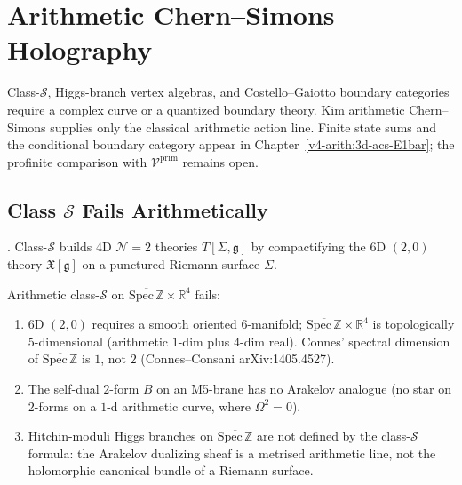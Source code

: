 \chapter{Arithmetic Chern--Simons Holography}
\label{v4-arith:gaiotto}

Class-\(\mathcal S\), Higgs-branch vertex algebras, and
Costello--Gaiotto boundary categories require a complex curve or a
quantized boundary theory. Kim arithmetic Chern--Simons supplies only
the classical arithmetic action line. Finite state sums and the
conditional boundary category appear in
Chapter~\ref{v4-arith:3d-acs-E1bar}; the profinite comparison with
\(\mathcal V^{\mathrm{prim}}\) remains open.

\section{Class \(\mathcal{S}\) Fails Arithmetically}
\label{v4-arith:ga:class-S-fails}

\begin{theorem}
\label{v4-arith:thm:gaiotto-class-S}
\ClaimStatusProvedElsewhere. Class-\(\mathcal{S}\) builds
4D \(\mathcal{N}=2\) theories \(T[\Sigma,\mathfrak{g}]\) by
compactifying the 6D \((2,0)\) theory \(\mathfrak{X}[\mathfrak{g}]\) on
a punctured Riemann surface \(\Sigma\).
\end{theorem}

\begin{observation}
\label{v4-arith:obs:class-S-obstructions}
Arithmetic class-\(\mathcal{S}\) on \(\overline{\mathrm{Spec}\,\mathbb{Z}}\times\mathbb{R}^{4}\)
fails:
\begin{enumerate}
\item 6D \((2,0)\) requires a smooth oriented \(6\)-manifold;
\(\overline{\mathrm{Spec}\,\mathbb{Z}}\times\mathbb{R}^{4}\) is
topologically \(5\)-dimensional (arithmetic \(1\)-dim plus \(4\)-dim
real). Connes' spectral dimension of \(\overline{\mathrm{Spec}\,\mathbb{Z}}\)
is \(1\), not \(2\) (Connes--Consani arXiv:1405.4527).
\item The self-dual \(2\)-form \(B\) on an M5-brane has no Arakelov
analogue (no star on \(2\)-forms on a \(1\)-d arithmetic curve, where
\(\Omega^{2}=0\)).
\item Hitchin-moduli Higgs branches on
\(\overline{\mathrm{Spec}\,\mathbb{Z}}\) are not defined by the
class-\(\mathcal S\) formula: the Arakelov dualizing sheaf is a
metrised arithmetic line, not the holomorphic canonical bundle of a
Riemann surface.
\end{enumerate}
\end{observation}

